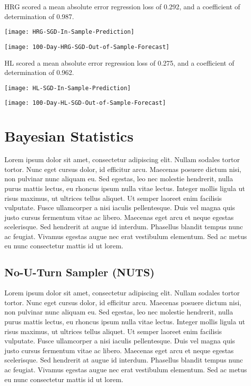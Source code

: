 HRG scored a mean absolute error regression loss of 0.292, and a coefficient of determination of 0.987.

\texttt{[image: HRG-SGD-In-Sample-Prediction]}

\texttt{[image: 100-Day-HRG-SGD-Out-of-Sample-Forecast]}

HL scored a mean absolute error regression loss of 0.275, and a coefficient of determination of 0.962.

\texttt{[image: HL-SGD-In-Sample-Prediction]}

\texttt{[image: 100-Day-HL-SGD-Out-of-Sample-Forecast]}

\section{Bayesian Statistics}
Lorem ipsum dolor sit amet, consectetur adipiscing elit. Nullam sodales tortor tortor. Nunc eget cursus dolor, id efficitur arcu. Maecenas posuere dictum nisi, non pulvinar nunc aliquam eu. Sed egestas, leo nec molestie hendrerit, nulla purus mattis lectus, eu rhoncus ipsum nulla vitae lectus. Integer mollis ligula ut risus maximus, ut ultrices tellus aliquet. Ut semper laoreet enim facilisis vulputate. Fusce ullamcorper a nisi iaculis pellentesque. Duis vel magna quis justo cursus fermentum vitae ac libero. Maecenas eget arcu et neque egestas scelerisque. Sed hendrerit at augue id interdum. Phasellus blandit tempus nunc ac feugiat. Vivamus egestas augue nec erat vestibulum elementum. Sed ac metus eu nunc consectetur mattis id ut lorem.

\subsection{No-U-Turn Sampler (NUTS)}
Lorem ipsum dolor sit amet, consectetur adipiscing elit. Nullam sodales tortor tortor. Nunc eget cursus dolor, id efficitur arcu. Maecenas posuere dictum nisi, non pulvinar nunc aliquam eu. Sed egestas, leo nec molestie hendrerit, nulla purus mattis lectus, eu rhoncus ipsum nulla vitae lectus. Integer mollis ligula ut risus maximus, ut ultrices tellus aliquet. Ut semper laoreet enim facilisis vulputate. Fusce ullamcorper a nisi iaculis pellentesque. Duis vel magna quis justo cursus fermentum vitae ac libero. Maecenas eget arcu et neque egestas scelerisque. Sed hendrerit at augue id interdum. Phasellus blandit tempus nunc ac feugiat. Vivamus egestas augue nec erat vestibulum elementum. Sed ac metus eu nunc consectetur mattis id ut lorem.


